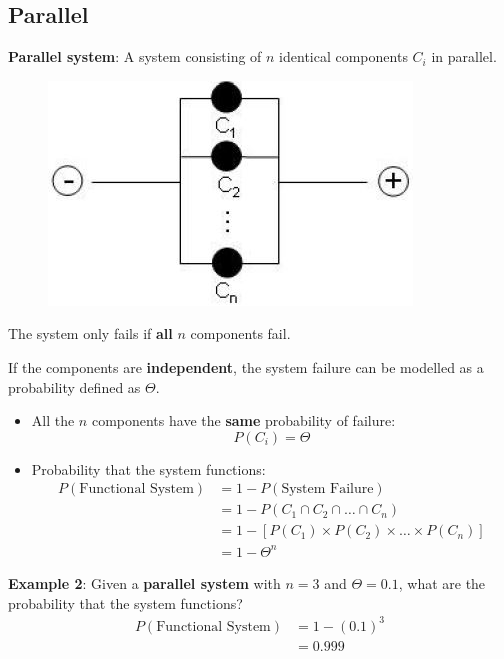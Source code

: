 \documentclass[10pt,a4paper]{article}
\begin{document}
\subsection{Parallel}

\begin{tcolorbox}[breakable,colback=white]
    \textbf{Parallel system}: A system consisting of $n$ identical components $C_i$ in parallel.
\end{tcolorbox}

\begin{figure} [h!]
    \centering
    \includegraphics[scale=0.6]{parallel_circuit.JPG}
\end{figure}

The system only fails if \textbf{all} $n$ components fail. 

If the components are \textbf{independent}, the system failure can be modelled as a probability
defined as $\Theta$.

\begin{itemize}
    \item All the $n$ components have the \textbf{same} probability of failure:
    $$
        P(C_i) = \Theta
    $$
    \item Probability that the system functions:
    \begin{align*}
        P(\text{Functional System}) &= 1 - P(\text{System Failure}) \\
        &= 1 - P(C_1 \cap C_2 \cap \dots \cap C_n) \\
        &= 1 - [P(C_1) \times P(C_2) \times \dots \times P(C_n)] \\
        &= 1 - \Theta^n
    \end{align*}
\end{itemize}

\textbf{Example 2}: Given a \textbf{parallel system} with $n=3$ and $\Theta=0.1$, what are the
probability that the system functions?
\begin{align*}
    P(\text{Functional System}) &= 1 - (0.1)^3 \\
    &= 0.999
\end{align*}
\end{document}

